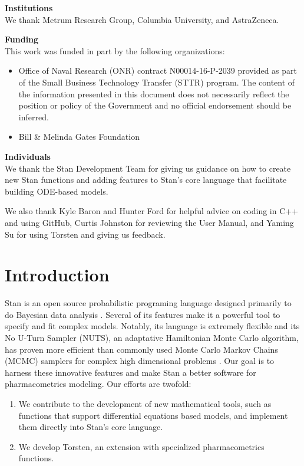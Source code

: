 \documentclass[11pt]{amsart}
\begin{document}
{\bf Institutions} \ \\
We thank Metrum Research Group, Columbia University, and AstraZeneca.

{\bf Funding}  \ \\
This work was funded in part by the following organizations:
\begin{itemize}
  \item Office of Naval Research (ONR) contract N00014-16-P-2039 provided as part  of the Small Business Technology Transfer (STTR) program. The content of the information presented in this document does not necessarily reflect the position or policy of the Government and no official endorsement should be inferred.
  \item Bill \& Melinda Gates Foundation
\end{itemize}

{\bf Individuals} \ \\
We thank the Stan Development Team for giving us guidance on how to create new Stan functions and adding features to Stan's core language that facilitate building ODE-based models.

We also thank Kyle Baron and Hunter Ford for helpful advice on coding in C++ and using GitHub, Curtis Johnston for reviewing the User Manual, and Yaming Su for using Torsten and giving us feedback.

\pagebreak

\section{Introduction}

Stan is an open source probabilistic programing language designed primarily to do Bayesian data analysis \cite{stan}. Several of its features make it a powerful tool to specify and fit complex models. Notably, its language is extremely flexible and its No U-Turn Sampler (NUTS), an adaptative Hamiltonian Monte Carlo algorithm, has proven more efficient than commonly used Monte Carlo Markov Chains (MCMC) samplers for complex high dimensional problems \cite{nuts}. Our goal is to harness these innovative features and make Stan a better software for pharmacometrics modeling. Our efforts are twofold:
\begin{enumerate}
  \item We contribute to the development of new mathematical tools, such as functions that support differential equations based models, and implement them directly into Stan's core language.
  \item We develop Torsten, an extension with specialized pharmacometrics functions.
\end{enumerate}
\end{document}
